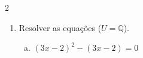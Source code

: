 \documentclass[a4paper,14pt]{article}
\begin{document}
\begin{multicols}{2}
\begin{enumerate}
\begin{enumerate}[a)]
				\item $(x + 4)^2 + 10 = 0$ \\\\\\\\\\\\\\\\\\\\
				\item $\bigg(\frac{2x + 5}{7}\bigg)^2 + \frac{2}{3} = 0$ \\\\\\\\\\\\\\\\\\\\\\
				\item $-5x^2 - 320 = 0$ \\\\\\\\\\\\\\\\\\\\\\\\\\\\\\
				\item $-\bigg(\frac{x + 2}{6}\bigg)^2 - \frac{3}{4} = 0$ \\\\\\\\\\\\\\\\\\\\
			\end{enumerate}
			\item Resolver as equações ($U = \mathbb{Q}$). 
			\begin{enumerate}[a)]
				\item $(3x - 2)^2 - (3x - 2) = 0$ \\\\\\\\\\\\\\\\\\\\

\end{enumerate}
\end{enumerate}
\end{multicols}
\end{document}
